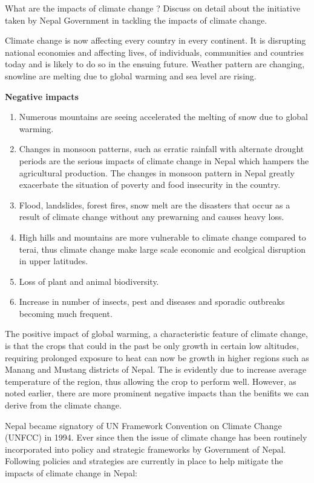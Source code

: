 \documentclass[
  openany]{book}
\providecommand{\tightlist}{%
  \setlength{\itemsep}{0pt}\setlength{\parskip}{0pt}}
\begin{document}
What are the impacts of climate change ? Discuss on detail about the initiative taken by Nepal Government in tackling the impacts of climate change.

Climate change is now affecting every country in every continent. It is disrupting national economies and affecting lives, of individuals, communities and countries today and is likely to do so in the ensuing future. Weather pattern are changing, snowline are melting due to global warming and sea level are rising.

\textbf{Negative impacts}

\begin{enumerate}
\def\labelenumi{\arabic{enumi}.}
\tightlist
\item
  Numerous mountains are seeing accelerated the melting of snow due to global warming.
\item
  Changes in monsoon patterns, such as erratic rainfall with alternate drought periods are the serious impacts of climate change in Nepal which hampers the agricultural production. The changes in monsoon pattern in Nepal greatly exacerbate the situation of poverty and food insecurity in the country.
\item
  Flood, landslides, forest fires, snow melt are the disasters that occur as a result of climate change without any prewarning and causes heavy loss.
\item
  High hills and mountains are more vulnerable to climate change compared to terai, thus climate change make large scale economic and ecolgical disruption in upper latitudes.
\item
  Loss of plant and animal biodiversity.
\item
  Increase in number of insects, pest and diseases and sporadic outbreaks becoming much frequent.
\end{enumerate}

The positive impact of global warming, a characteristic feature of climate change, is that the crops that could in the past be only growth in certain low altitudes, requiring prolonged exposure to heat can now be growth in higher regions such as Manang and Mustang districts of Nepal. The is evidently due to increase average temperature of the region, thus allowing the crop to perform well. However, as noted earlier, there are more prominent negative impacts than the benifits we can derive from the climate change.

Nepal became signatory of UN Framework Convention on Climate Change (UNFCC) in 1994. Ever since then the issue of climate change has been routinely incorporated into policy and strategic frameworks by Government of Nepal. Following policies and strategies are currently in place to help mitigate the impacts of climate change in Nepal:
\end{document}
